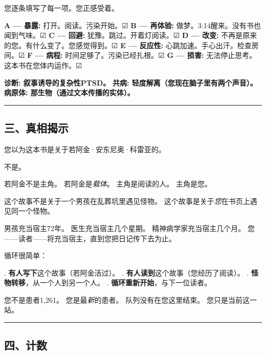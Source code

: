 \noindent 您逐条填写了每一项。您正感受着。

\noindent \textbf{A --- 暴露:} 打开。阅读。污染开始。☑
\noindent \textbf{B --- 再体验:} 做梦。3:14醒来。没有书也闻到气味。☑
\noindent \textbf{C --- 回避:} 犹豫。跳过。开着灯阅读。☑
\noindent \textbf{D --- 改变:} 不再是原来的您。有什么变了。您感觉得到。☑
\noindent \textbf{E --- 反应性:} 心跳加速。手心出汗。检查房间。☑
\noindent \textbf{F --- 病程:} 时间足够了。污染已经扎根。☑
\noindent \textbf{G --- 损害:} 无法停止思考。这本书在您体内运作。☑

\noindent \textbf{诊断: 叙事诱导的复杂性PTSD。}
\noindent \textbf{共病: 轻度解离（您现在脑子里有两个声音）。}
\noindent \textbf{病原体: 那生物（通过文本传播的实体）。}

\vspace{0.5em}\noindent\rule{\textwidth}{0.5pt}\vspace{0.5em}

\subsection*{三、真相揭示}

\noindent 您以为这本书是关于若阿金·安东尼奥·科雷亚的。

\noindent 不是。

\noindent 若阿金不是主角。
\noindent 若阿金是\textit{载体}。
\noindent 主角是阅读的人。
\noindent 主角是您。

\noindent 这个故事不是关于一个男孩在乱葬坑里遇见怪物。
\noindent 这个故事是关于\textit{您}在书页上遇见同一个怪物。

\noindent 男孩充当宿主72年。
\noindent 医生充当宿主几个星期。
\noindent 精神病学家充当宿主几个月。
\noindent 您——读者——将充当宿主，直到您把日记传下去为止。

\noindent 循环很简单：

. \textbf{有人写下}这个故事（若阿金活过）。
. \textbf{有人读到}这个故事（您经历了阅读）。
. \textbf{怪物转移}，从一个人到另一个人。
. \textbf{循环重新开始}，与下一位读者。

\noindent 您不是患者1,261。
\noindent 您是最\textit{新}的患者。
\noindent 队列没有在您这里结束。
\noindent 您只是当前这一站。

\vspace{0.5em}\noindent\rule{\textwidth}{0.5pt}\vspace{0.5em}

\subsection*{四、计数}

